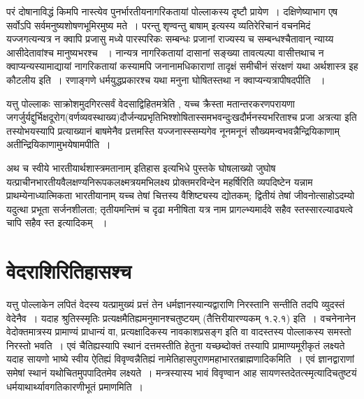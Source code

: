 परं दोषानाविद्धं किमपि नास्त्येव पुनर्भारतीयनागरिकतायां पोल्लाकस्य दृष्टौ प्रायेण~। दक्षिणेष्याभाग एष सर्वोऽपि सर्वमनुष्यशोषणभूमिरमुष्य मते~। परन्तु शृण्वन्तु बाषाम्  इत्यस्य व्यतिरेरिचानं वचनमिदं यज्जगत्यन्यत्र न क्वापि प्रजासु मध्ये पारस्परिकः सम्बन्धः प्रजानां राज्यस्य च सम्बन्धश्चैतावान् न्याय्य आसीदेतावांश्च मानुष्यभरश्च ~। नान्यत्र नागरिकतायां दासानां सङ्ख्या तावत्यल्पा वासीत्तथाच न क्वाप्यन्यस्यामाद्यायां नागरिकतायां कस्यामपि जनानामधिकाराणां  तादृक्षं समीचीनं संरक्षणं यथा अर्थशास्त्र इह कौटलीय इति~। रणाङ्गणे धर्मयुद्धप्रकारश्च यथा मनुना घोषितस्तथा न क्वाप्यन्यत्रापीषदपीति ~।

यत्तु पोल्लाकः साक्रोशमुदगिरत्सर्वं वेदसाद्विहितमत्रेति , यच्च क्रैस्ता मतान्तरकरणपरायणा जगर्जुर्यद्दुर्भिक्षदूरोग(वर्णव्यवस्थाख्य)दौर्जन्यप्रभृतिभिश्शोषितास्समभवन्दुःखदौर्मनस्यभरिताश्च प्रजा अत्रत्या इति तस्योभयस्यापि प्रत्याख्यानं बाषमेनैव प्रत्तमस्ति  यज्जनास्स्सम्यगेव नूनमनूनं सौख्यमन्वभवन्नैन्द्रियिकाणाम् अतीन्द्रियिकाणामुभयेषामपीति~।

अथ च स्वीये भारतीयार्थशास्त्रमतानाम् इतिहास इत्यभिधे पुस्तके घोषलाख्यो जुघोष यत्प्राचीनभारतीयवैलक्षण्यनिरूपकलक्ष्मत्रयमभिलक्ष्य प्रोक्तमरविन्देन महर्षिरिति व्यपदिष्टेन  यन्नाम प्राथम्येनाध्यात्मिकता भारतीयानाम् यच्च तेषां चित्तस्य वैशिष्ट्यस्य द्योतकम्; द्वितीयं तेषां जीवनोत्साहोऽदम्यो यदुत्था प्रभूता सर्जनशीलता; तृतीयमन्तिमं च दृढा मनीषिता यत्र नाम प्रागल्भ्यमार्दवे सहैव स्तस्सारल्याढ्यत्वे चापि सहैव स्त इत्यादिकम् ~।


\section*{वेदराशिरितिहासश्च}

यत्तु पोल्लाकेन लपितं वेदस्य यत्प्रामुख्यं प्रत्तं तेन धर्मज्ञानस्यान्यद्वाराणि निरस्तानि सन्तीति तदपि व्युदस्तं वेदेनैव~। यदाह श्रुतिस्स्मृतिः प्रत्यक्षमैतिह्यमनुमानश्चतुष्टयम् (तैत्तिरीयारण्यकम् १.२.१) इति~। वचनेनानेन वेदोक्तमात्रस्य प्रामाण्यं प्राधान्यं वा, प्रत्यक्षादिकस्य नावकाशप्रसङ्ग इति वा वादस्तस्य पोल्लाकस्य समस्तो निरस्तो भवति~। एवं चैतिह्यस्यापि स्थानं दत्तमस्तीति हेतुना यच्छब्दोक्तं तस्यापि प्रामाण्यमूरीकृतं लक्ष्यते यदाह सायणो भाष्ये स्वीय ऐतिह्यं विवृण्वन्नैतिह्यं नामेतिहासपुराणमहाभारतब्राह्मणादिकमिति~। एवं ज्ञानद्वाराणां समेषां स्थानं यथोचितमुपपादितमेव लक्ष्यते~। मन्त्रस्यास्य भावं विवृण्वान आह सायणस्तदेतत्स्मृत्यादिचतुष्टयं धर्मयाथार्थ्यावगतिकारणीभूतं प्रमाणमिति~।

